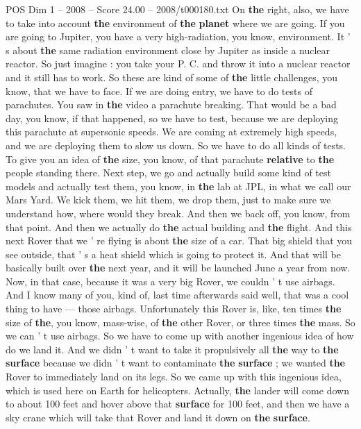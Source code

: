 \begin{textsample}{POS Dim 1 – 2008 – Score 24.00 – 2008/t000180.txt}
On \textbf{the} right, also, we have to take into account \textbf{the} environment of \textbf{the} \textbf{planet} where we are going.
If you are going to Jupiter, you have a very high-radiation, you know, environment.
It ' s about \textbf{the} same radiation environment close by Jupiter as inside a nuclear reactor.
So just imagine : you take your P.
C. and throw it into a nuclear reactor and it still has to work.
So these are kind of some of \textbf{the} little challenges, you know, that we have to face.
If we are doing entry, we have to do tests of parachutes.
You saw in \textbf{the} video a parachute breaking.
That would be a bad day, you know, if that happened, so we have to test, because we are deploying this parachute at supersonic speeds.
We are coming at extremely high speeds, and we are deploying them to slow us down.
So we have to do all kinds of tests.
To give you an idea of \textbf{the} size, you know, of that parachute \textbf{relative} to \textbf{the} people standing there.
Next step, we go and actually build some kind of test models and actually test them, you know, in \textbf{the} lab at JPL, in what we call our Mars Yard.
We kick them, we hit them, we drop them, just to make sure we understand how, where would they break.
And then we back off, you know, from that point.
And then we actually do \textbf{the} actual building and \textbf{the} flight.
And this next Rover that we ' re flying is about \textbf{the} size of a car.
That big shield that you see outside, that ' s a heat shield which is going to protect it.
And that will be basically built over \textbf{the} next year, and it will be launched June a year from now.
Now, in that case, because it was a very big Rover, we couldn ' t use airbags.
And I know many of you, kind of, last time afterwards said well, that was a cool thing to have — those airbags.
Unfortunately this Rover is, like, ten times \textbf{the} size of \textbf{the}, you know, mass-wise, of \textbf{the} other Rover, or three times \textbf{the} mass.
So we can ' t use airbags.
So we have to come up with another ingenious idea of how do we land it.
And we didn ' t want to take it propulsively all \textbf{the} way to \textbf{the} \textbf{surface} because we didn ' t want to contaminate \textbf{the} \textbf{surface} ; we wanted \textbf{the} Rover to immediately land on its legs.
So we came up with this ingenious idea, which is used here on Earth for helicopters.
Actually, \textbf{the} lander will come down to about 100 feet and hover above that \textbf{surface} for 100 feet, and then we have a sky crane which will take that Rover and land it down on \textbf{the} \textbf{surface}.

\end{textsample}
